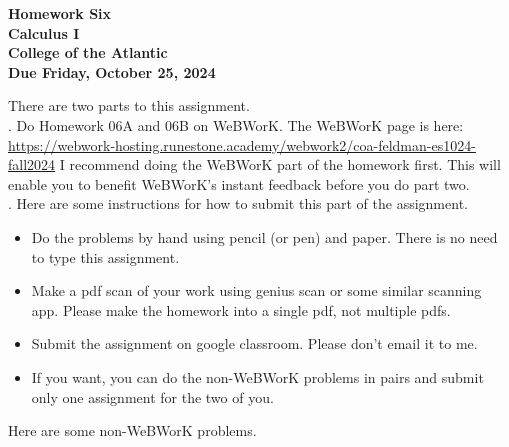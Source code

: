 \documentclass[12pt]{article}
\begin{document}
\pagestyle{empty}
 
\begin{center}
{\LARGE {\bf Homework Six}}\\
\bigskip
{\Large {\bf Calculus I}}\\
\bigskip
{\Large {\bf College of the Atlantic}}\\
\bigskip
{ {\bf Due Friday, October 25, 2024}}\\ 
\end{center}
\medskip


\noindent There are two parts to this assignment.\\

.  Do Homework 06A and 06B on
WeBWorK.  The WeBWorK page is here:
\url{https://webwork-hosting.runestone.academy/webwork2/coa-feldman-es1024-fall2024}
I recommend doing the WeBWorK part of the homework first.  This will
enable you to benefit WeBWorK's instant feedback before you do part
two.\\ 


.  Here are some
instructions for how to submit this part of the assignment.
\begin{itemize}
  \setlength{\itemsep}{0mm}
\item Do the problems by hand using pencil (or pen) and paper.
  There is no need to type this assignment.
\item Make a pdf scan of your work using genius scan or some
  similar scanning app.  Please make the homework into a single
  pdf, not multiple pdfs.
\item Submit the assignment on google classroom.  Please don't
  email it to me.
\item If you want, you can do the non-WeBWorK problems in pairs and
  submit only one assignment for the two of you. \\
\end{itemize}

\noindent Here are some non-WeBWorK problems.\\
\end{document}
